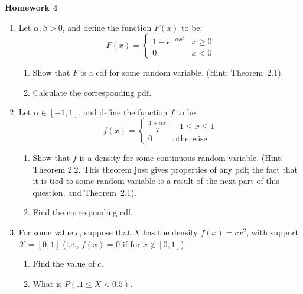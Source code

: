 \documentclass[10pt,twoside]{article}\usepackage[]{graphicx}\usepackage[dvipsnames,svgnames,table]{xcolor}
\begin{document}
\begin{flushright}
\begin{minipage}{.33\textwidth}
\rightline{\today}
\end{minipage}
\end{flushright}

\begin{center}
{\large{\textbf{Homework 4}}}
\end{center}

\begin{enumerate}
    
    \item Let $\alpha, \beta > 0$, and define the function $F(x)$ to be:
    $$
    F(x) = \begin{cases} 
      1 - e^{-\alpha x^\beta} & x \geq 0 \\
      0 & x < 0
    \end{cases}
    $$
    \begin{enumerate}
      \item Show that $F$ is a cdf for some random variable. (Hint: Theorem~2.1). 
      \item Calculate the corresponding pdf. 
    \end{enumerate}
    
    \item Let $\alpha \in [-1, 1]$, and define the function $f$ to be
    $$
    f(x) = \begin{cases}
      \frac{1+\alpha x}{2} & -1 \leq x \leq 1 \\
      0 & \text{otherwise}
    \end{cases}
    $$
    
    \begin{enumerate}
      \item Show that $f$ is a density for some continuous random variable. (Hint: Theorem 2.2. This theorem just gives properties of any pdf; the fact that it is tied to some random variable is a result of the next part of this question, and Theorem~2.1).
      \item Find the corresponding cdf. 
    \end{enumerate}
    
    \item For some value $c$, suppose that $X$ has the density $f(x) = cx^2$, with support $\mathcal{X} = [0, 1]$ (i.e., $f(x) = 0$ if for $x \notin [0, 1]$).
    \begin{enumerate}
      \item Find the value of $c$.
      \item What is $P(.1 \leq X < 0.5)$.
    \end{enumerate}
    

\end{enumerate}
\end{document}
